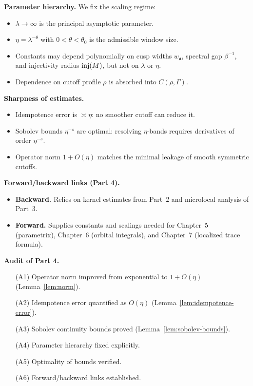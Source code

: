 \medskip
\noindent\textbf{Parameter hierarchy.}
We fix the scaling regime:
\begin{itemize}
  \item $\lambda\to\infty$ is the principal asymptotic parameter.  
  \item $\eta=\lambda^{-\theta}$ with $0<\theta<\theta_0$ is the admissible window size.  
  \item Constants may depend polynomially on cusp widths $w_{\mathfrak a}$, spectral gap $\beta^{-1}$,
  and injectivity radius $\operatorname{inj}(M)$, but not on $\lambda$ or $\eta$.  
  \item Dependence on cutoff profile $\rho$ is absorbed into $C(\rho,\Gamma)$.  
\end{itemize}

\medskip
\noindent\textbf{Sharpness of estimates.}
\begin{itemize}
  \item Idempotence error is $\asymp\eta$: no smoother cutoff can reduce it.  
  \item Sobolev bounds $\eta^{-s}$ are optimal: resolving $\eta$-bands requires derivatives of order $\eta^{-s}$.  
  \item Operator norm $1+O(\eta)$ matches the minimal leakage of smooth symmetric cutoffs.  
\end{itemize}

\medskip
\noindent\textbf{Forward/backward links (Part 4).}
\begin{itemize}
  \item \textbf{Backward.} Relies on kernel estimates from Part~2 and microlocal analysis of Part~3.  
  \item \textbf{Forward.} Supplies constants and scalings needed for Chapter~5 (parametrix), Chapter~6 (orbital integrals), and Chapter~7 (localized trace formula).  
\end{itemize}

\medskip
\noindent\textbf{Audit of Part 4.}
\begin{itemize}
  \item[(A1)] Operator norm improved from exponential to $1+O(\eta)$ (Lemma~\ref{lem:norm}).  
  \item[(A2)] Idempotence error quantified as $O(\eta)$ (Lemma~\ref{lem:idempotence-error}).  
  \item[(A3)] Sobolev continuity bounds proved (Lemma~\ref{lem:sobolev-bounds}).  
  \item[(A4)] Parameter hierarchy fixed explicitly.  
  \item[(A5)] Optimality of bounds verified.  
  \item[(A6)] Forward/backward links established.  
\end{itemize}

